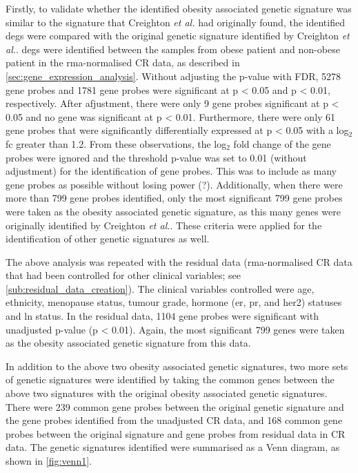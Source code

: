 Firstly, to validate whether the identified obesity associated genetic signature was similar to the signature that Creighton \textit{et al.} had originally found, the identified \glspl{deg} were compared with the original genetic signature identified by Creighton \textit{et al.}.
\glspl{deg}  were identified between the samples from obese patient and non-obese patient in the \gls{rma}-normalised CR data, as described in \cref{sec:gene_expression_analysis}.
Without adjusting the p-value with FDR, 5278 gene probes and 1781 gene probes were significant at p \textless{} 0.05 and p \textless{} 0.01, respectively.
After afjustment, there were only 9 gene probes significant at p \textless{} 0.05 and no gene was significant at p \textless{} 0.01.
Furthermore, there were only 61 gene probes that were significantly differentially expressed at p \textless{} 0.05 with a log$_2$ \gls{fc} greater than 1.2.
From these observations, the log$_2$ fold change of the gene probes were ignored and the threshold p-value was set to 0.01 (without adjustment) for the identification of gene probes.
This was to include as many gene probes as possible without losing power (?).
Additionally, when there were more than 799 gene probes identified, only the most significant 799 gene probes were taken as the obesity associated genetic signature, as this many genes were originally identified by Creighton \textit{et al.}.
These criteria were applied for the identification of other genetic signatures as well.

The above analysis was repeated with the residual data (\gls{rma}-normalised CR data that had been controlled for other clinical variables; see \cref{sub:residual_data_creation}).
The clinical variables controlled were age, ethnicity, menopause status, tumour grade, hormone (\gls{er}, \gls{pr}, and \gls{her2}) statuses  and \gls{ln} status.
In the residual data, 1104 gene probes were significant with unadjusted p-value (p \textless{} 0.01).
Again, the most significant 799 genes were taken as the obesity associated genetic signature from this data.

In addition to the above two obesity associated genetic signatures, two more sets of genetic signatures were identified by taking the common genes between the above two signatures with the original obesity associated genetic signatures.
There were 239 common gene probes between the original genetic signature and the gene probes identified from the unadjusted CR data, and 168 common gene probes between the original signature and gene probes from residual data in CR data.
The genetic signatures identified were summarised as a Venn diagram, as shown in \cref{fig:venn1}.
\\

